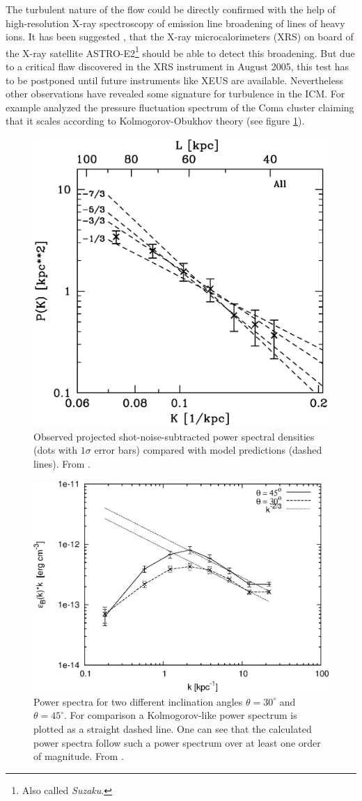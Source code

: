 The turbulent nature of the flow could be directly confirmed with the help of
high-resolution X-ray spectroscopy of emission line broadening of lines of
heavy ions. It has been suggested \citep{Sunyaev2003}, that the X-ray
microcalorimeters (XRS) on board of the X-ray satellite ASTRO-E2\footnote{Also
called \emph{Suzaku}.} should be able to detect this broadening. But due to a
critical flaw discovered in the XRS instrument in August 2005, this test has to
be
postponed until future instruments like XEUS are available. Nevertheless other
observations have revealed some signature for turbulence in the ICM.
For example \citet{Schuecker2004} analyzed the pressure
fluctuation spectrum of the Coma cluster claiming that it scales according to
Kolmogorov-Obukhov theory (see figure \ref{fig:schuecker}).

\begin{figure}[tp]
\centering
\includegraphics[width=0.7\linewidth]{chapter8/1039fg12.eps}
\caption{Observed projected shot-noise-subtracted 
power spectral densities (dots with $1\sigma$ error bars) compared with model
predictions (dashed lines). From \citet{Schuecker2004}.}
\label{fig:schuecker}
\end{figure}
\begin{figure}[tp]
\centering
\includegraphics[width=0.7\linewidth]{chapter8/fig7.eps}
\caption{Power spectra for two different
inclination angles $\theta = 30^\circ$ and $\theta = 45^\circ$.
For comparison a Kolmogorov-like power spectrum is
plotted as a straight dashed line. One can see that the calculated
power spectra follow such a power spectrum over at least one order of
magnitude. From \citet{Vogt2005}.}
\label{fig:vogt}
\end{figure}

